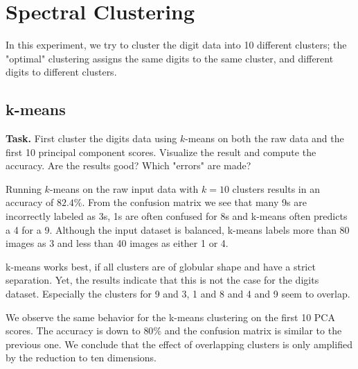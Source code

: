 \documentclass{support/acm_proc_article-sp}
\begin{document}

    \section{Spectral Clustering}

    In this experiment, we try to cluster the digit data into 10 different clusters;
    the "optimal" clustering assigns the same digits to the same cluster, and different digits to
    different clusters.


    \subsection{k-means}
    \label{subsec:k-means}

    \textbf{Task.} First cluster the digits data using $k$-means on both the raw data and the first 10
    principal component scores.
    Visualize the result and compute the accuracy.
    Are the results good?
    Which "errors" are made?

    Running $k$-means on the raw input data with $k = 10$ clusters results in an accuracy of $82.4\%$.
    From the confusion matrix we see that many 9s are incorrectly labeled as 3s, 1s are often confused for 8s
    and k-means often predicts a 4 for a 9.
    Although the input dataset is balanced, k-means labels more than 80 images as 3 and less than 40 images
    as either 1 or 4.

    k-means works best, if all clusters are of globular shape and have a strict separation.
    Yet, the results indicate that this is not the case for the digits dataset.
    Especially the clusters for 9 and 3, 1 and 8 and 4 and 9 seem to overlap.

    We observe the same behavior for the k-means clustering on the first 10 PCA scores.
    The accuracy is down to $80\%$ and the confusion matrix is similar to the previous one.
    We conclude that the effect of overlapping clusters is only amplified by the reduction to ten dimensions.

\end{document}
